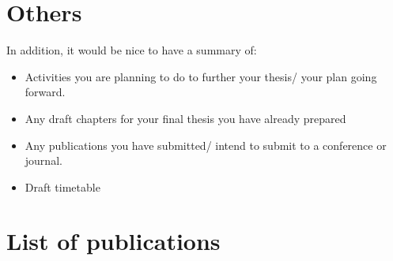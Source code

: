 \section{Others}
In addition, it would be nice to have a summary of:
\begin{itemize}
	\item Activities you are planning to do to further your thesis/ your plan going forward.
	\item Any draft chapters for your final thesis you have already prepared
	\item Any publications you have submitted/ intend to submit to a conference or journal.
	\item Draft timetable 
\end{itemize}

\section{List of publications}
